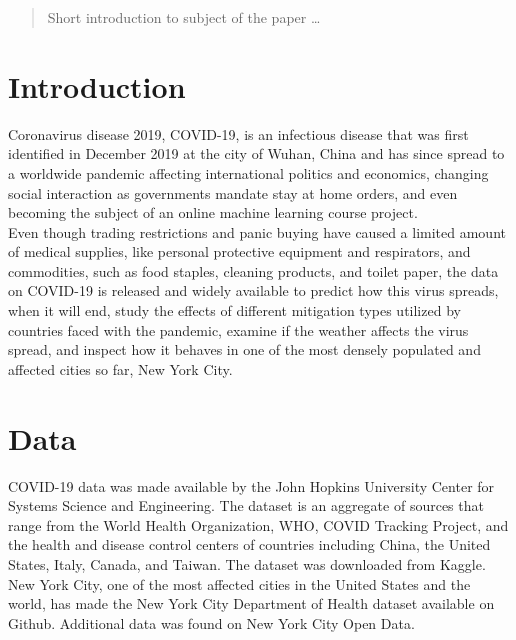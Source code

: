 \documentclass{homework}
\begin{document}
\maketitle

\begin{abstract}
  Short introduction to subject of the paper \ldots
\end{abstract}

\newpage
\thispagestyle{empty}
\tableofcontents

\newpage
\setcounter{page}{1}
\section{Introduction}

Coronavirus disease 2019, COVID-19, is an infectious disease that was first identified in December 2019 at the city of Wuhan, China and has since spread to a worldwide pandemic affecting international politics and economics, changing social interaction as governments mandate stay at home orders, and even becoming the subject of an online machine learning course project.\\

Even though trading restrictions and panic buying have caused a limited amount of medical supplies, like personal protective equipment and respirators, and commodities, such as food staples, cleaning products, and toilet paper, the data on COVID-19 is released and widely available to predict how this virus spreads, when it will end, study the effects of different mitigation types utilized by countries faced with the pandemic, examine if the weather affects the virus spread, and inspect how it behaves in one of the most densely populated and affected cities so far, New York City.

\section{Data}

COVID-19 data was made available by the John Hopkins University Center for Systems Science and Engineering. The dataset is an aggregate of sources that range from the World Health Organization, WHO, COVID Tracking Project, and the health and disease control centers of countries including China, the United States, Italy, Canada, and Taiwan. The dataset was downloaded from Kaggle. \\

New York City, one of the most affected cities in the United States and the world, has made the New York City Department of Health dataset available on Github. Additional data was found on New York City Open Data.\\
\end{document}
